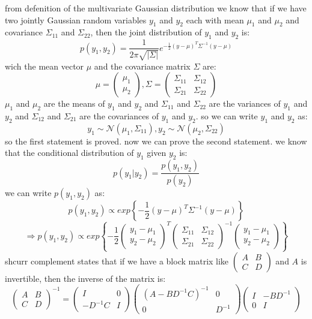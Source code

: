\begin{qsolve}
	\begin{qsolve}[]
		from defenition of the multivariate Gaussian distribution we know that if we have two jointly Gaussian random variables $y_1$ and $y_2$ each with mean $\mu_1$ and $\mu_2$ and covariance $\Sigma_{11}$ and $\Sigma_{22}$, then the joint distribution of $y_1$ and $y_2$ is:
		$$p(y_1,y_2) = \dfrac{1}{2\pi\sqrt{|\Sigma|}} e^{-\frac{1}{2}(y-\mu)^T\Sigma^{-1}(y-\mu)}$$
		wich the mean vector $\mu$ and the covariance matrix $\Sigma$ are:
		$$\mu = \begin{pmatrix} \mu_1 \\ \mu_2 \end{pmatrix} , \Sigma = \begin{pmatrix} \Sigma_{11} & \Sigma_{12} \\ \Sigma_{21} & \Sigma_{22} \end{pmatrix}$$
		$\mu_1$ and $\mu_2$ are the means of $y_1$ and $y_2$ and $\Sigma_{11}$ and $\Sigma_{22}$ are the variances of $y_1$ and $y_2$ and $\Sigma_{12}$ and $\Sigma_{21}$ are the covariances of $y_1$ and $y_2$. so we can write $y_1$ and $y_2$ as:
		$$y_1 \sim \mathcal{N}(\mu_1, \Sigma_{11}) , y_2 \sim \mathcal{N}(\mu_2, \Sigma_{22})$$
		so the first statement is proved. now we can prove the second statement. we know that the conditional distribution of $y_1$ given $y_2$ is:
		$$p(y_1|y_2) = \dfrac{p(y_1,y_2)}{p(y_2)}$$
		we can write $p(y_1,y_2)$ as:
		$$p(y_1,y_2) \propto exp\left\{-\dfrac{1}{2} (y-\mu)^T \Sigma^{-1} (y-\mu)\right\}$$
		$$\Rightarrow p(y_1,y_2) \propto exp\left\{-\dfrac{1}{2} \begin{pmatrix} y_1-\mu_1 \\ y_2-\mu_2 \end{pmatrix}^T \begin{pmatrix} \Sigma_{11} & \Sigma_{12} \\ \Sigma_{21} & \Sigma_{22} \end{pmatrix}^{-1} \begin{pmatrix} y_1-\mu_1 \\ y_2-\mu_2 \end{pmatrix}\right\}$$
		\splitqsolve[\splitqsolve]
		shcurr complement states that if we have a block matrix like $\begin{pmatrix} A & B \\ C & D \end{pmatrix}$ and $A$ is invertible, then the inverse of the matrix is:
		$$\begin{pmatrix} A & B \\ C & D \end{pmatrix}^{-1} = \begin{pmatrix} I & 0 \\ -D^{-1}C & I \end{pmatrix} \begin{pmatrix} (A-BD^{-1}C)^{-1} & 0 \\ 0 & D^{-1} \end{pmatrix}  \begin{pmatrix} I & -BD^{-1} \\ 0 & I \end{pmatrix}$$

\end{qsolve}
\end{qsolve}

